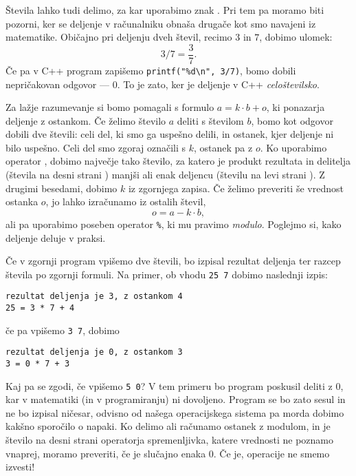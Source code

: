 
Števila lahko tudi delimo, za kar uporabimo znak \koda{/}.
Pri tem pa moramo biti pozorni, ker se deljenje v računalniku obnaša drugače kot
smo navajeni iz matematike.
Običajno pri deljenju dveh števil, recimo $3$ in $7$, dobimo ulomek:
\[
  3 / 7 = \frac{3}{7}.
\]
Če pa v C++ program zapišemo \verb+printf("%d\n", 3/7)+, bomo dobili
nepričakovan odgovor --- $0$.
To je zato, ker je deljenje v C++ \emph{celoštevilsko}.

Za lažje razumevanje si bomo pomagali s formulo $a = k \cdot b + o$, ki
ponazarja deljenje z ostankom.
Če želimo število $a$ deliti s številom $b$, bomo kot odgovor dobili dve
števili: celi del, ki smo ga uspešno delili, in ostanek, kjer deljenje ni bilo
uspešno.
Celi del smo zgoraj označili s $k$, ostanek pa z $o$.
Ko uporabimo operator \koda{/}, dobimo največje tako število, za katero je
produkt rezultata in delitelja (števila na desni strani \koda{/}) manjši ali
enak deljencu (številu na levi strani \koda{/}).
Z drugimi besedami, dobimo $k$ iz zgornjega zapisa.
Če želimo preveriti še vrednost ostanka $o$, jo lahko izračunamo iz ostalih
števil,
\[
  o = a - k \cdot b,
\]
ali pa uporabimo poseben operator \verb+%+, ki mu pravimo \emph{modulo}.
Poglejmo si, kako deljenje deluje v praksi.


Če v zgornji program vpišemo dve števili, bo izpisal rezultat deljenja ter
razcep števila po zgornji formuli.
Na primer, ob vhodu \verb+25 7+ dobimo naslednji izpis:
\begin{verbatim}
rezultat deljenja je 3, z ostankom 4
25 = 3 * 7 + 4
\end{verbatim}
če pa vpišemo \verb+3 7+, dobimo
\begin{verbatim}
rezultat deljenja je 0, z ostankom 3
3 = 0 * 7 + 3
\end{verbatim}
Kaj pa se zgodi, če vpišemo \verb+5 0+?
V tem primeru bo program poskusil deliti z $0$, kar v matematiki (in v
programiranju) ni dovoljeno.
Program se bo zato sesul in ne bo izpisal ničesar, odvisno od našega
operacijskega sistema pa morda dobimo kakšno sporočilo o napaki.
Ko delimo ali računamo ostanek z modulom, in je število na desni strani
operatorja spremenljivka, katere vrednosti ne poznamo vnaprej, moramo preveriti,
če je slučajno enaka $0$.
Če je, operacije ne smemo izvesti!